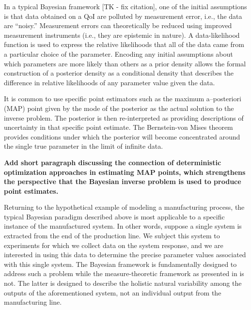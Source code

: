 In a typical Bayesian framework [TK - fix citation]\cite{0266-5611-7-5-003,
  Kennedy_O_JRSSSB_2001,Tarantola_book, MNR07, CDS10,starktenorio,
  AlexanderianPetraStadlerEtAl14, Bui-ThanhGhattas14, Ernst2014,
  0266-5611-30-11-110301, ROM:CMW_2016,Stuart10,
  cockayneoatessullivangirolami}, one of the initial assumptions is that data obtained on a QoI are polluted by measurement error, i.e., the data are ``noisy.''
  Measurement errors can theoretically be reduced using improved measurement instruments (i.e., they are epistemic in nature).
  A data-likelihood function is used to express the relative likelihoods that all of the data came from a particular choice of the parameter.
  Encoding any initial assumptions about which parameters are more likely than others as a prior density allows the formal construction of a posterior density as a conditional density that describes the difference in relative likelihoods of any parameter value given the data.

It is common to use specific point estimators such as the maximum a--posteriori (MAP) point given by the mode of the posterior as the actual solution to the inverse problem.
The posterior is then re-interpreted as providing descriptions of uncertainty in that specific point estimate.
The Bernstein-von Mises theorem provides conditions under which the posterior will become concentrated around the single true parameter in the limit of infinite data.

{\bf Add short paragraph discussing the connection of deterministic optimization approaches in estimating MAP points, which strengthens the perspective that the Bayesian inverse problem is used to produce point estimates.}

Returning to the hypothetical example of modeling a manufacturing process, the typical Bayesian paradigm described above is most applicable to a specific instance of the manufactured system.
In other words, suppose a single system is extracted from the end of the production line.
We subject this system to experiments for which we collect data on the system response, and we are interested in using this data to determine the precise parameter values associated with this single system.
The Bayesian framework is fundamentally designed to address such a problem while the measure-theoretic framework as presented in \cite{BJW18a, BJW18b, BWY20} is not.
The latter is designed to describe the holistic natural variability among the outputs of the aforementioned system, not an individual output from the manufacturing line.
